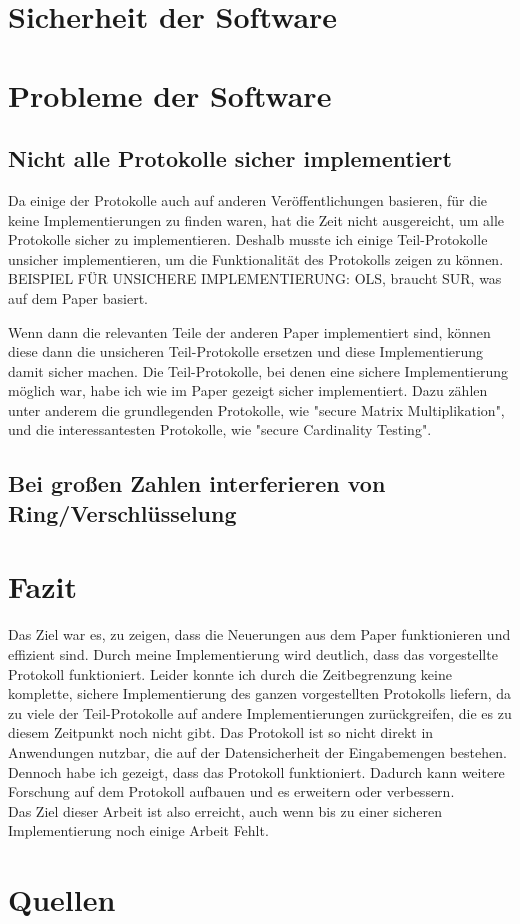 \documentclass[a4paper,10pt]{scrartcl}
\begin{document}
\section{Sicherheit der Software}

\section{Probleme der Software}
\subsection{Nicht alle Protokolle sicher implementiert}
Da einige der Protokolle auch auf anderen Veröffentlichungen basieren, für die keine Implementierungen zu finden waren, hat die Zeit nicht ausgereicht, um alle Protokolle sicher zu implementieren. Deshalb musste ich einige Teil-Protokolle unsicher implementieren, um die Funktionalität des Protokolls zeigen zu können.\\
BEISPIEL  FÜR UNSICHERE IMPLEMENTIERUNG:
OLS, braucht SUR, was auf dem Paper \cite{tcc-2007-3673} basiert.

Wenn dann die relevanten Teile der anderen Paper implementiert sind, können diese dann die unsicheren Teil-Protokolle ersetzen und diese Implementierung damit sicher machen.
Die Teil-Protokolle, bei denen eine sichere Implementierung möglich war, habe ich wie im Paper gezeigt sicher implementiert. Dazu zählen unter anderem die grundlegenden Protokolle, wie "secure Matrix Multiplikation", und die interessantesten Protokolle, wie "secure Cardinality Testing".\\



\subsection{Bei großen Zahlen interferieren von Ring/Verschlüsselung}

\section{Fazit}
Das Ziel war es, zu zeigen, dass die Neuerungen aus dem Paper \cite{Doettling2021} funktionieren und effizient sind. Durch meine Implementierung wird deutlich, dass das vorgestellte Protokoll funktioniert. 
Leider konnte ich durch die Zeitbegrenzung keine komplette, sichere Implementierung des ganzen vorgestellten Protokolls liefern, da zu viele der Teil-Protokolle auf andere Implementierungen zurückgreifen, die es zu diesem Zeitpunkt noch nicht gibt.
Das Protokoll ist so nicht direkt in Anwendungen nutzbar, die auf der Datensicherheit der Eingabemengen bestehen.
Dennoch habe ich gezeigt, dass das Protokoll funktioniert. Dadurch kann weitere Forschung auf dem Protokoll aufbauen und es erweitern oder verbessern.\\
Das Ziel dieser Arbeit ist also erreicht, auch wenn bis zu einer sicheren Implementierung noch einige Arbeit Fehlt.


\section{Quellen}

\end{document}
